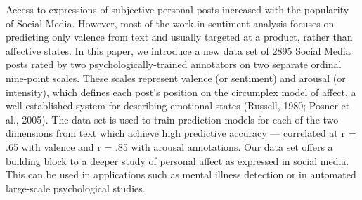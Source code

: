 Access to expressions of subjective personal posts increased with the popularity of Social Media. However, most of the work in sentiment analysis focuses on predicting only valence from text and usually targeted at a product, rather than affective states. In this paper, we introduce a new data set of 2895 Social Media posts rated by two psychologically-trained annotators on two separate ordinal nine-point scales. These scales represent valence (or sentiment) and arousal (or intensity), which defines each post's position on the circumplex model of affect, a well-established system for describing emotional states (Russell, 1980; Posner et al., 2005). The data set is used to train prediction models for each of the two dimensions from text which achieve high predictive accuracy --- correlated at r = .65 with valence and r = .85 with arousal annotations. Our data set offers a building block to a deeper study of personal affect as expressed in social media. This can be used in applications such as mental illness detection or in automated large-scale psychological studies.
